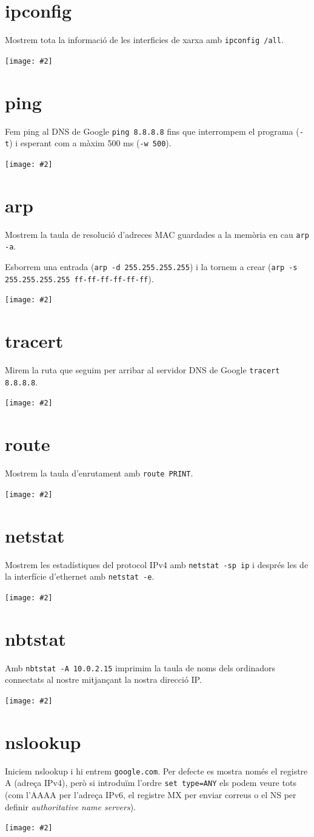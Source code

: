 \documentclass[a4paper,12pt]{article}
\newcommand{\mygraphic}[2][width=\textwidth]{\begin{center}
		\centering\texttt{[image: \#2]}\par
\end{center}}
\begin{document}

\newpage

\tableofcontents
\newpage

\section{ipconfig}
Mostrem tota la informació  de les interficies de xarxa amb \texttt{ipconfig /all}.
\mygraphic{imatges/1.png}

\newpage
\section{ping}
Fem ping al DNS de Google \texttt{ping 8.8.8.8} fins que interrompem el programa (\texttt{-t}) i esperant com a màxim 500 ms (\texttt{-w 500}).
\mygraphic{imatges/2.png}

\newpage
\section{arp}
Mostrem la taula de resolució d'adreces MAC guardades a la memòria en cau \texttt{arp -a}.

Esborrem una entrada (\texttt{arp -d 255.255.255.255}) i la tornem a crear (\texttt{arp -s 255.255.255.255 ff-ff-ff-ff-ff-ff}).
\mygraphic{imatges/3.png}

\newpage
\section{tracert}
Mirem la ruta que seguim per arribar al servidor DNS de Google \texttt{tracert 8.8.8.8}.
\mygraphic{imatges/4.png}

\newpage
\section{route}
Mostrem la taula d'enrutament amb \texttt{route PRINT}.
\mygraphic{imatges/5.png}

\newpage
\section{netstat}
Mostrem les estadístiques del protocol IPv4 amb \texttt{netstat -sp ip} i després les de la interfície d'ethernet amb \texttt{netstat -e}.
\mygraphic{imatges/6.png}

\newpage
\section{nbtstat}
Amb \texttt{nbtstat -A 10.0.2.15} imprimim la taula de noms dels ordinadors connectats al nostre mitjançant la nostra direcció IP.
\mygraphic{imatges/7.png}

\newpage
\section{nslookup}
Iniciem nslookup i hi entrem \texttt{google.com}. Per defecte es mostra només el registre A (adreça IPv4), però si introduïm l'ordre \texttt{set type=ANY} els podem veure tots (com l'AAAA per l'adreça IPv6, el registre MX per enviar correus o el NS per definir \textit{authoritative name servers}).
\mygraphic{imatges/8.png}
\end{document}

